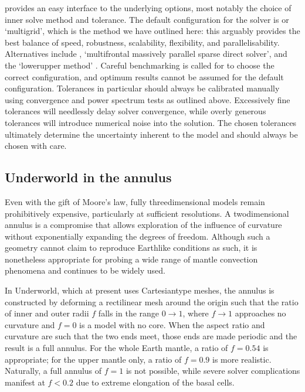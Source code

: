 \documentclass[letterpaper,10pt,english]{jupyterBook}
\begin{document}
\sphinxAtStartPar
{} provides an easy interface to the underlying  options, most notably the choice of inner solve method and tolerance. The default configuration for the solver is  or ‘multigrid’, which is the method we have outlined here: this arguably provides the best balance of speed, robustness, scalability, flexibility, and parallelisability. Alternatives include , ‘multifrontal massively parallel sparse direct solver’, and the ‘lower\sphinxhyphen{}upper method’ . Careful benchmarking is called for to choose the correct configuration, and optimum results cannot be assumed for the default configuration. Tolerances in particular should always be calibrated manually using convergence and power spectrum tests as outlined above. Excessively fine tolerances will needlessly delay solver convergence, while overly generous tolerances will introduce numerical noise into the solution. The chosen tolerances ultimately determine the uncertainty inherent to the model and should always be chosen with care.


\subsection{Underworld in the annulus}
\label{\detokenize{content/chapter_02_methods/section2:underworld-in-the-annulus}}
\sphinxAtStartPar
Even with the gift of Moore’s law, fully three\sphinxhyphen{}dimensional models remain prohibitively expensive, particularly at sufficient resolutions. A two\sphinxhyphen{}dimensional annulus is a compromise that allows exploration of the influence of curvature without exponentially expanding the degrees of freedom. Although such a geometry cannot claim to reproduce Earth\sphinxhyphen{}like conditions as such, it is nonetheless appropriate for probing a wide range of mantle convection phenomena and continues to be widely used.

\sphinxAtStartPar
In Underworld, which at present uses Cartesian\sphinxhyphen{}type meshes, the annulus is constructed by deforming a rectilinear mesh around the origin such that the ratio of inner and outer radii \(f\) falls in the range \(0\to1\), where \(f\to1\) approaches no curvature and \(f=0\) is a model with no core. When the aspect ratio and curvature are such that the two ends meet, those ends are made periodic and the result is a full annulus. For the whole Earth mantle, a ratio of \(f=0.54\) is appropriate; for the upper mantle only, a ratio of \(f = 0.9\) is more realistic. Naturally, a full annulus of \(f=1\) is not possible, while severe solver complications manifest at \(f<0.2\) due to extreme elongation of the basal cells.
\end{document}
